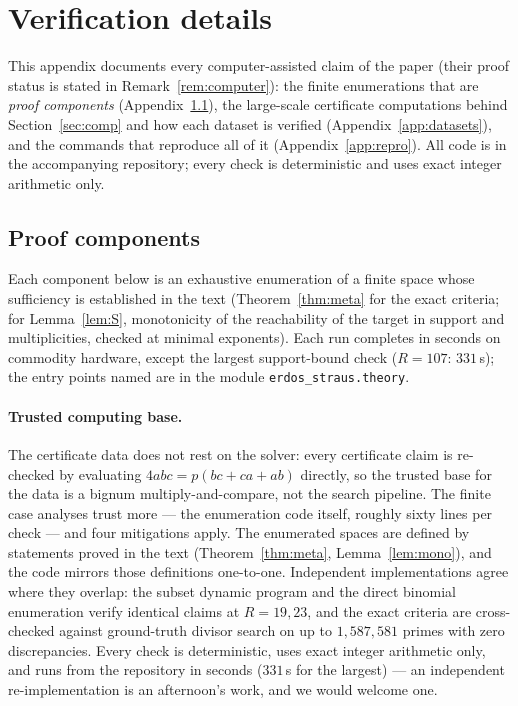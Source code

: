 \documentclass[11pt]{article}
\theoremstyle{plain}
\theoremstyle{remark}
\theoremstyle{plain}
\numberwithin{equation}{section}
\begin{document}
\appendix

\section{Verification details}\label{app:verif}

This appendix documents every computer-assisted claim of the paper
(their proof status is stated in Remark~\ref{rem:computer}): the
finite enumerations that are \emph{proof components}
(Appendix~\ref{app:proof-components}), the large-scale certificate
computations behind Section~\ref{sec:comp} and how each dataset is
verified (Appendix~\ref{app:datasets}), and the commands that reproduce
all of it (Appendix~\ref{app:repro}). All code is in the accompanying
repository; every check is deterministic and uses exact integer
arithmetic only.

\subsection{Proof components}\label{app:proof-components}

Each component below is an exhaustive enumeration of a finite space whose
sufficiency is established in the text (Theorem~\ref{thm:meta} for the
exact criteria; for Lemma~\ref{lem:S}, monotonicity of the
reachability of the target in support and multiplicities, checked at
minimal exponents).
Each run completes in seconds on commodity hardware, except the largest
support-bound check ($R = 107$: \mbox{$331$\,s}); the entry points
named are in the module \texttt{erdos\_straus.theory}.

\paragraph{Trusted computing base.} The certificate data does not rest
on the solver: every certificate claim is re-checked by evaluating
$4abc = p(bc+ca+ab)$ directly, so the trusted base for the data is a
bignum multiply-and-compare, not the search pipeline. The finite case
analyses trust more --- the enumeration code itself, roughly sixty
lines per check --- and four mitigations apply. The enumerated spaces
are defined by statements proved in the text (Theorem~\ref{thm:meta},
Lemma~\ref{lem:mono}), and the code mirrors those definitions
one-to-one. Independent implementations agree where they overlap: the
subset dynamic program and the direct binomial enumeration verify
identical claims at $R = 19, 23$, and the exact criteria are
cross-checked against ground-truth divisor search on up to
$1{,}587{,}581$ primes with zero discrepancies. Every check is
deterministic, uses exact integer arithmetic only, and runs from the
repository in seconds ($331$\,s for the largest) --- an independent
re-implementation is an afternoon's work, and we would welcome one.
\end{document}
